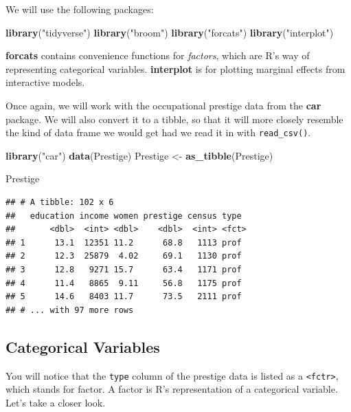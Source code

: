 \documentclass[
  12pt,
  oneside,openany]{book}
\newenvironment{Shaded}{\begin{snugshade}}{\end{snugshade}}
\newcommand{\KeywordTok}[1]{\textcolor[rgb]{0.13,0.29,0.53}{\textbf{#1}}}
\newcommand{\NormalTok}[1]{#1}
\newcommand{\StringTok}[1]{\textcolor[rgb]{0.31,0.60,0.02}{#1}}
\begin{document}
We will use the following packages:

\begin{Shaded}
\begin{Highlighting}[]
\KeywordTok{library}\NormalTok{(}\StringTok{"tidyverse"}\NormalTok{)}
\KeywordTok{library}\NormalTok{(}\StringTok{"broom"}\NormalTok{)}
\KeywordTok{library}\NormalTok{(}\StringTok{"forcats"}\NormalTok{)}
\KeywordTok{library}\NormalTok{(}\StringTok{"interplot"}\NormalTok{)}
\end{Highlighting}
\end{Shaded}

\textbf{forcats} contains convenience functions for \emph{factors}, which are R's way of representing categorical variables. \textbf{interplot} is for plotting marginal effects from interactive models.

Once again, we will work with the occupational prestige data from the \textbf{car} package. We will also convert it to a tibble, so that it will more closely resemble the kind of data frame we would get had we read it in with \texttt{read\_csv()}.

\begin{Shaded}
\begin{Highlighting}[]
\KeywordTok{library}\NormalTok{(}\StringTok{"car"}\NormalTok{)}
\KeywordTok{data}\NormalTok{(Prestige)}
\NormalTok{Prestige <{-}}\StringTok{ }\KeywordTok{as\_tibble}\NormalTok{(Prestige)}

\NormalTok{Prestige}
\end{Highlighting}
\end{Shaded}

\begin{verbatim}
## # A tibble: 102 x 6
##   education income women prestige census type 
##       <dbl>  <int> <dbl>    <dbl>  <int> <fct>
## 1      13.1  12351 11.2      68.8   1113 prof 
## 2      12.3  25879  4.02     69.1   1130 prof 
## 3      12.8   9271 15.7      63.4   1171 prof 
## 4      11.4   8865  9.11     56.8   1175 prof 
## 5      14.6   8403 11.7      73.5   2111 prof 
## # ... with 97 more rows
\end{verbatim}

\hypertarget{categorical-variables-1}{%
\subsection{Categorical Variables}\label{categorical-variables-1}}

You will notice that the \texttt{type} column of the prestige data is listed as a \texttt{\textless{}fctr\textgreater{}}, which stands for factor. A factor is R's representation of a categorical variable. Let's take a closer look.
\end{document}
